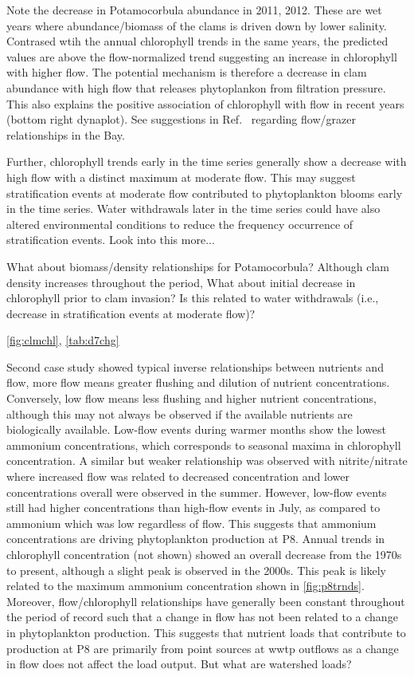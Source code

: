 \documentclass[journal = esthag, manuscript = article]{achemso}\usepackage[]{graphicx}\usepackage[]{color}
\begin{document}
Note the decrease in Potamocorbula abundance in 2011, 2012.  These are wet years where abundance/biomass of the clams is driven down by lower salinity.  Contrased wtih the annual chlorophyll trends in the same years, the predicted values are above the flow-normalized trend suggesting an increase in chlorophyll with higher flow.  The potential mechanism is therefore a decrease in clam abundance with high flow that releases phytoplankon from filtration pressure.  This also explains the positive association of chlorophyll with flow in recent years (bottom right dynaplot). See suggestions in Ref.~ regarding flow/grazer relationships in the Bay. 

Further, chlorophyll trends early in the time series generally show a decrease with high flow with a distinct maximum at moderate flow.  This may suggest stratification events at moderate flow contributed to phytoplankton blooms early in the time series. Water withdrawals later in the time series could have also altered environmental conditions to reduce the frequency occurrence of stratification events.  Look into this more...

What about biomass/density relationships for Potamocorbula?  Although clam density increases throughout the period,  What about initial decrease in chlorophyll prior to clam invasion?  Is this related to water withdrawals (i.e., decrease in stratification events at moderate flow)?

\cref{fig:clmchl}, \cref{tab:d7chg}

Second case study showed typical inverse relationships between nutrients and flow, more flow means greater flushing and dilution of nutrient concentrations.  Conversely, low flow means less flushing and higher nutrient concentrations, although this may not always be observed if the available nutrients are biologically available.  Low-flow events during warmer months show the lowest ammonium concentrations, which corresponds to seasonal maxima in chlorophyll concentration.  A similar but weaker relationship was observed with nitrite/nitrate where increased flow was related to decreased concentration and lower concentrations overall were observed in the summer.  However, low-flow events still had higher concentrations than high-flow events in July, as compared to ammonium which was low regardless of flow.  This suggests that ammonium concentrations are driving phytoplankton production at P8.  Annual trends in chlorophyll concentration (not shown) showed an overall decrease from the 1970s to present, although a slight peak is observed in the 2000s.  This peak is likely related to the maximum ammonium concentration shown in \cref{fig:p8trnds}.  Moreover, flow/chlorophyll relationships have generally been constant throughout the period of record such that a change in flow has not been related to a change in phytoplankton production.  This suggests that nutrient loads that contribute to production at P8 are primarily from point sources at \ac{wwtp} outflows as a change in flow does not affect the load output.  But what are watershed loads?  
\end{document}
